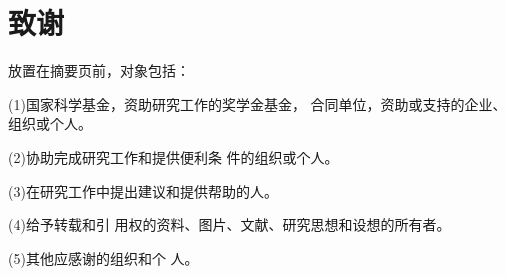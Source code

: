 \chapter*{致谢}
放置在摘要页前，对象包括：

(1)国家科学基金，资助研究工作的奖学金基金，
合同单位，资助或支持的企业、组织或个人。

(2)协助完成研究工作和提供便利条
件的组织或个人。

(3)在研究工作中提出建议和提供帮助的人。

(4)给予转载和引
用权的资料、图片、文献、研究思想和设想的所有者。

(5)其他应感谢的组织和个
人。 

